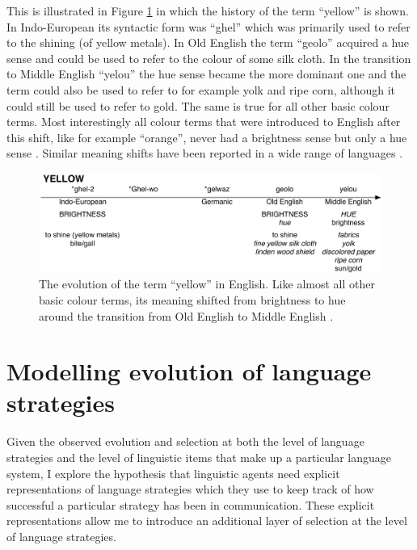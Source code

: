 This is illustrated in Figure \ref{f:history-yellow} in which the
history of the term ``yellow'' is shown. In Indo-European its
syntactic form was ``ghel'' which was primarily used to refer to the
shining (of yellow metals). In Old English the term ``geolo'' acquired
a hue sense and could be used to refer to the colour of some silk
cloth. In the transition to Middle English ``yelou'' the hue sense
became the more dominant one and the term could also be used to refer
to for example yolk and ripe corn, although it could still be used to
refer to gold. The same is true for all other basic colour terms. Most
interestingly all colour terms that were introduced to English after
this shift, like for example ``orange'', never had a brightness sense
but only a hue sense \citep{casson97shift}. Similar meaning shifts
have been reported in a wide range of languages
\citep{maclaury92brightness}.

\begin{figure}[htbp]
  \begin{center}
   \includegraphics[width=\textwidth]{./intro/figures/history-yellow.pdf}
   \caption[The evolution of the term ``yellow'' in English]{The
     evolution of the term ``yellow'' in English. Like almost all
     other basic colour terms, its meaning shifted from brightness to
     hue around the transition from Old English to Middle
     English \citep{casson97shift}.}
    \label{f:history-yellow}
  \end{center}
\end{figure}

\section{Modelling evolution of language strategies}

Given the observed evolution and selection at both the level of
language strategies and the level of linguistic items that make up a
particular language system, I explore the hypothesis that linguistic
agents need explicit representations of language strategies which they
use to keep track of how successful a particular strategy has been in
communication. These explicit representations allow me to introduce an
additional layer of selection at the level of language strategies.

